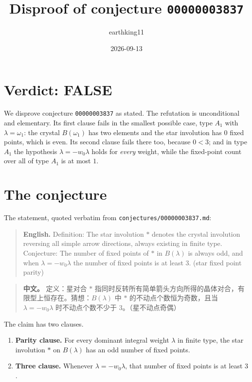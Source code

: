 \documentclass[11pt]{article}
\title{Disproof of conjecture \texttt{00000003837}}
\author{earthking11}
\date{2026-09-13}
\theoremstyle{definition}
\theoremstyle{remark}
\begin{document}
\maketitle

\section*{Verdict: FALSE}

We disprove conjecture \texttt{00000003837} as stated. The refutation is
unconditional and elementary. Its first clause fails in the smallest possible
case, type $A_1$ with $\lambda = \omega_1$: the crystal $B(\omega_1)$ has two
elements and the star involution has $0$ fixed points, which is even. Its second
clause fails there too, because $0 < 3$; and in type $A_1$ the hypothesis
$\lambda = -w_0\lambda$ holds for \emph{every} weight, while the fixed-point
count over all of type $A_1$ is at most $1$.

\section{The conjecture}

The statement, quoted verbatim from \texttt{conjectures/00000003837.md}:

\begin{quote}
\textbf{English.} Definition: The star involution $*$ denotes the crystal
involution reversing all simple arrow directions, always existing in finite
type. Conjecture: The number of fixed points of $*$ in $B(\lambda)$ is always
odd, and when $\lambda = -w_0\lambda$ the number of fixed points is at least 3.
(star fixed point parity)
\end{quote}

\begin{quote}
\textbf{中文。} 定义：星对合 $*$ 指同时反转所有简单箭头方向所得的晶体对合，有限型上恒存在。猜想：$B(\lambda)$ 中 $*$ 的不动点个数恒为奇数，且当 $\lambda = -w_0\lambda$ 时不动点个数不少于 3。（星不动点奇偶）
\end{quote}

The claim has two clauses.

\begin{enumerate}
\item \textbf{Parity clause.} For every dominant integral weight $\lambda$ in
  finite type, the star involution $*$ on $B(\lambda)$ has an odd number of
  fixed points.
\item \textbf{Three clause.} Whenever $\lambda = -w_0\lambda$, that number of
  fixed points is at least $3$.
\end{enumerate}
\end{document}
